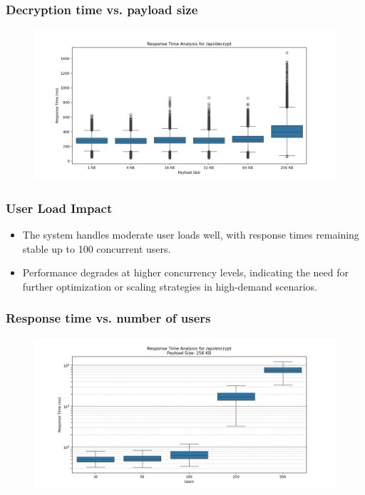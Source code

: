 \documentclass{beamer}
\begin{document}
\begin{frame}
\frametitle{Decryption time vs. payload size}
\begin{figure}
\includegraphics[width=\textwidth,height=0.7\textheight,keepaspectratio]{images/phase2/response_time_api_decrypt.png}
\end{figure}
\end{frame}

\begin{frame}
\frametitle{User Load Impact}
\begin{itemize}
\item The system handles moderate user loads well, with response times remaining stable up to 100 concurrent users.
\item Performance degrades at higher concurrency levels, indicating the need for further optimization or scaling strategies in high-demand scenarios.
\end{itemize}
\end{frame}

\begin{frame}
\frametitle{Response time vs. number of users}
\begin{figure}
\includegraphics[width=\textwidth,height=0.7\textheight,keepaspectratio]{images/phase3/response_time_api_encrypt_256KB.png}
\end{figure}
\end{frame}
\end{document}
